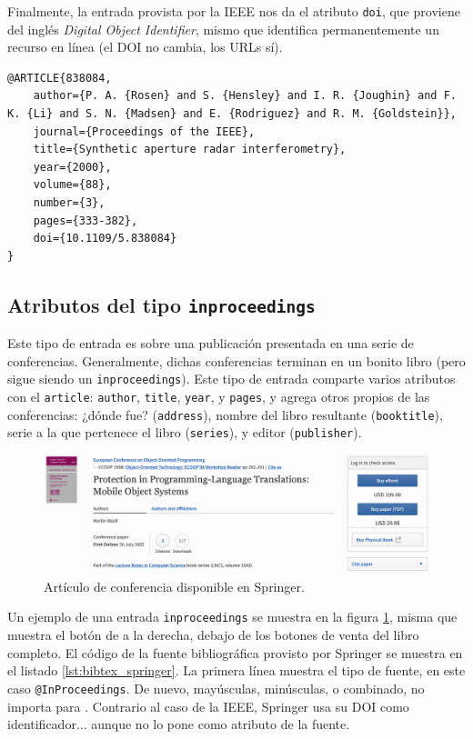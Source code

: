 Finalmente, la entrada provista por la IEEE nos da el atributo \texttt{doi}, que proviene del inglés \emph{Digital Object Identifier}, mismo que identifica permanentemente un recurso en línea (el DOI no cambia, los URLs sí).

\begin{lstlisting}[style=bibtex,caption={Entrada de un artículo de la IEEE.},label=lst:bibtex_ieee]
@ARTICLE{838084,
	author={P. A. {Rosen} and S. {Hensley} and I. R. {Joughin} and F. K. {Li} and S. N. {Madsen} and E. {Rodriguez} and R. M. {Goldstein}},
	journal={Proceedings of the IEEE},
	title={Synthetic aperture radar interferometry},
	year={2000},
	volume={88},
	number={3},
	pages={333-382},
	doi={10.1109/5.838084}
}
\end{lstlisting}



\subsection{Atributos del tipo \texttt{inproceedings}}



Este tipo de entrada es sobre una publicación presentada en una serie de conferencias. Generalmente, dichas conferencias terminan en un bonito libro (pero sigue siendo un \texttt{inproceedings}). Este tipo de entrada comparte varios atributos con el \texttt{article}: \texttt{author}, \texttt{title}, \texttt{year}, y \texttt{pages}, y agrega otros propios de las conferencias: ¿dónde fue? (\texttt{address}), nombre del libro resultante (\texttt{booktitle}), serie a la que pertenece el libro (\texttt{series}), y editor (\texttt{publisher}).

\begin{figure}[ht!]
	\centering
	\includegraphics[width=\linewidth]{img/ejemplo_springer.png}
	\caption{Artículo de conferencia disponible en Springer.}
	\label{fig:ejemplo_springer}
\end{figure}

Un ejemplo de una entrada \texttt{inproceedings} se muestra en la figura \ref{fig:ejemplo_springer}, misma que muestra el botón de  a la derecha, debajo de los botones de venta del libro completo. El código de la fuente bibliográfica provisto por Springer se muestra en el listado \ref{lst:bibtex_springer}. La primera línea muestra el tipo de fuente, en este caso \texttt{@InProceedings}. De nuevo, mayúsculas, minúsculas, o combinado, no importa para \BibTeX{}. Contrario al caso de la IEEE, Springer usa su DOI como identificador... aunque no lo pone como atributo de la fuente.

